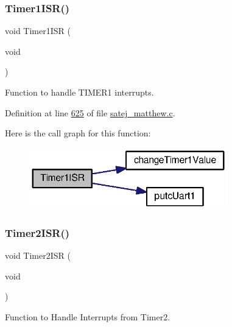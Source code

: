 \mbox{\label{tm4c123gh6pm__startup__ccs_8c_afdad67070c699e644b8ddae35b29347b}} 
\subsubsection{\texorpdfstring{Timer1ISR()}{Timer1ISR()}}
{\footnotesize\ttfamily void Timer1\+I\+SR (\begin{DoxyParamCaption}\item[{void}]{ }\end{DoxyParamCaption})}



Function to handle T\+I\+M\+E\+R1 interrupts. 



Definition at line \mbox{\hyperlink{satej__matthew_8c_source_l00625}{625}} of file \mbox{\hyperlink{satej__matthew_8c_source}{satej\+\_\+matthew.\+c}}.

Here is the call graph for this function\+:\nopagebreak
\begin{figure}[H]
\begin{center}
\leavevmode
\includegraphics[width=244pt]{tm4c123gh6pm__startup__ccs_8c_afdad67070c699e644b8ddae35b29347b_cgraph}
\end{center}
\end{figure}
\mbox{\label{tm4c123gh6pm__startup__ccs_8c_a424b9010ddc61d3484dca1b6af5af5b0}} 
\subsubsection{\texorpdfstring{Timer2ISR()}{Timer2ISR()}}
{\footnotesize\ttfamily void Timer2\+I\+SR (\begin{DoxyParamCaption}\item[{void}]{ }\end{DoxyParamCaption})}



Function to Handle Interrupts from Timer2. 



